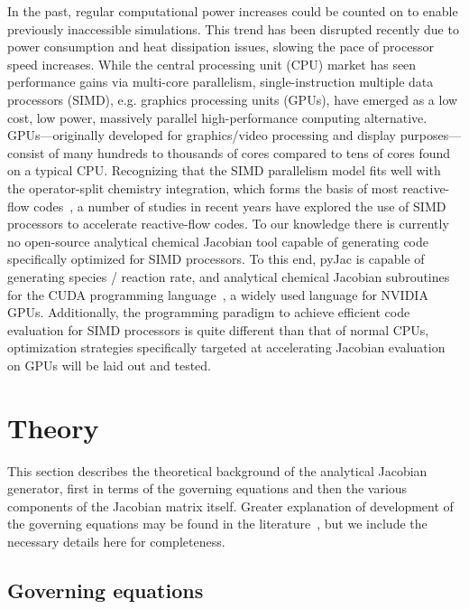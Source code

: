\documentclass[preprint,12pt]{elsarticle}
\begin{document}
In the past, regular computational power increases could be counted on to enable previously inaccessible simulations.  
This trend has been disrupted recently due to power consumption and heat dissipation issues, slowing the pace of processor speed increases.
While the central processing unit (CPU) market has seen performance gains via multi-core parallelism, single-instruction multiple data processors (SIMD), e.g. graphics processing units (GPUs),  have emerged as a low cost, low power, massively parallel high-performance computing alternative. 
GPUs---originally developed for graphics/video processing and display purposes---consist of many hundreds to thousands of cores compared to tens of cores found on a typical CPU.
Recognizing that the SIMD parallelism model fits well with the operator-split chemistry integration, which forms the basis of most reactive-flow codes~\cite{oran2005numerical}, a number of studies in recent years \cite{niemeyer_accelerating_2014,niemeyer_turbulence-chemistry_2011,shi_accelerating_2012,shi_redesigning_2011,spafford_accelerating_2010,stone_techniques_2013} have explored the use of SIMD processors to accelerate reactive-flow codes.
To our knowledge there is currently no open-source analytical chemical Jacobian tool capable of generating code specifically optimized for SIMD processors.
To this end, pyJac is capable of generating species / reaction rate, and analytical chemical Jacobian subroutines for the CUDA programming language~\cite{Nickolls:2008:SPP:1365490.1365500}, a widely used language for NVIDIA GPUs.
Additionally, the programming paradigm to achieve efficient code evaluation for SIMD processors is quite different than that of normal CPUs, optimization strategies specifically targeted at accelerating Jacobian evaluation on GPUs will be laid out and tested.


\section{Theory}

This section describes the theoretical background of the analytical Jacobian generator, first in terms of the governing equations and then the various components of the Jacobian matrix itself.
Greater explanation of development of the governing equations may be found in the literature~\cite{Law:2006tu,Warnatz:2006tq,Glassman:2008tq}, but we include the necessary details here for completeness.

\subsection{Governing equations}
\label{sec:goveq}
\end{document}
